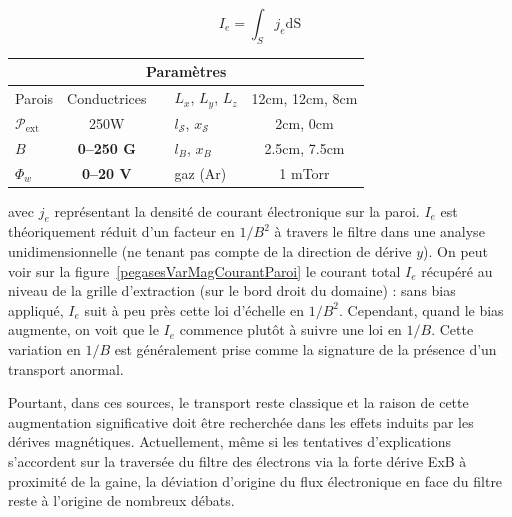 \begin{refsection}
\begin{equation}
I_e=\int_S j_e\text{dS}
\end{equation}
\begin{minipage}{\textwidth}
\footnotesize\centering
{}
\begin{tabular}{lcclc}\toprule
\multicolumn{5}{c}{\bf Paramètres}\\
\midrule 
Parois & Conductrices &&$L_x$, $L_y$, $L_z$  & 12cm, 12cm,
8cm\\
$\mathcal{P}_\text{ext}$&250W&&$l_\mathcal{S}$, $x_\mathcal{S}$&2cm, 0cm\\
$B$&\textbf{0--250 G}&&$l_B$, $x_B$&2.5cm, 7.5cm\\
$\Phi_w$ & \textbf{0--20 V}&&gaz (Ar) & 1 mTorr\\
\bottomrule
\end{tabular}
\label{4-PegasesScanMagParam}
\end{minipage}

avec $j_e$ représentant la densité de courant électronique sur la paroi. $I_e$
est théoriquement réduit d'un facteur en $1/B^2$ à travers le filtre dans une
analyse unidimensionnelle (ne tenant pas compte de la direction de dérive $y$).
On peut voir sur la figure~\ref{pegasesVarMagCourantParoi} le courant total
$I_e$ récupéré au niveau de la grille d'extraction (sur le bord droit du
domaine) : sans bias appliqué, $I_e$ suit à peu près cette loi d'échelle en
$1/B^2$. Cependant, quand le bias augmente, on voit que le $I_e$ commence plutôt
à suivre une loi en $1/B$. Cette variation en $1/B$ est généralement prise
comme la signature de la présence d'un transport anormal.

Pourtant, dans ces sources, le transport reste classique et la raison de cette
augmentation significative doit être recherchée dans les effets
induits par les dérives  magnétiques. Actuellement, même si les tentatives d'explications
s'accordent sur la traversée du filtre des électrons via la forte dérive ExB à proximité de la
gaine, la déviation d'origine du flux électronique en face du filtre reste à
l'origine de nombreux débats.


\end{refsection}
